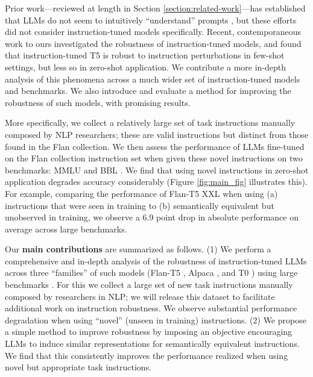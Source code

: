 


Prior work---reviewed at length in Section \ref{section:related-work}---has established that LLMs do not seem to intuitively ``understand'' prompts \cite{webson2021prompt,jang2023can, zhang2023aligning}, but these efforts did not consider instruction-tuned models specifically.
Recent, contemporaneous work to ours \cite{gu2023robustness} investigated the robustness of instruction-tuned models, and found that instruction-tuned T5 \cite{raffel2020exploring} is robust to instruction perturbations in few-shot settings, but less so in zero-shot application.
We contribute a more in-depth analysis of this phenomena across a much wider set of instruction-tuned models and benchmarks.
We also introduce and evaluate a method for improving the robustness of such models, with promising results.

More specifically, we collect a relatively large set of task instructions manually composed by NLP researchers; these are valid instructions but distinct from those found in the Flan collection.
We then assess the performance of LLMs fine-tuned on the Flan collection instruction set when given these novel instructions on two benchmarks: \textsc{MMLU} \cite{hendrycks2020measuring} and \textsc{BBL} \cite{srivastava2022beyond}.
We find that using novel instructions in zero-shot application degrades accuracy considerably (Figure \ref{fig:main_fig} illustrates this).
For example, comparing the performance of Flan-T5 XXL when using (a) instructions that were seen in training to (b) semantically equivalent but unobserved in training, we observe a 6.9 point drop in absolute performance on average across large benchmarks.

Our {\bf main contributions} are summarized as follows. (1) We perform a comprehensive and in-depth analysis of the robustness of instruction-tuned LLMs across three ``families'' of such models (Flan-T5 \cite{wei2021finetuned}, Alpaca \cite{alpaca}, and T0 \cite{sanh2021multitask}) using large benchmarks \cite{hendrycks2020measuring,srivastava2022beyond}.
For this we collect a large set of new task instructions manually composed by researchers in NLP; we will release this dataset to facilitate additional work on instruction robustness. We observe substantial performance degradation when using ``novel'' (unseen in training) instructions.
(2) We propose a simple method to improve robustness by imposing an objective encouraging LLMs to induce similar representations for semantically equivalent instructions.
We find that this consistently improves the performance realized when using novel but appropriate task instructions.


